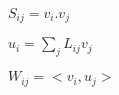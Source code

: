 \documentclass{article}
\begin{document}
$ S_{ij}= v_i . v_j $
\pagebreak

$ u_i = \sum_j L_{ij} v_j $
\pagebreak

$ W_{ij} = <v_i, u_j> $
\pagebreak
\end{document}
